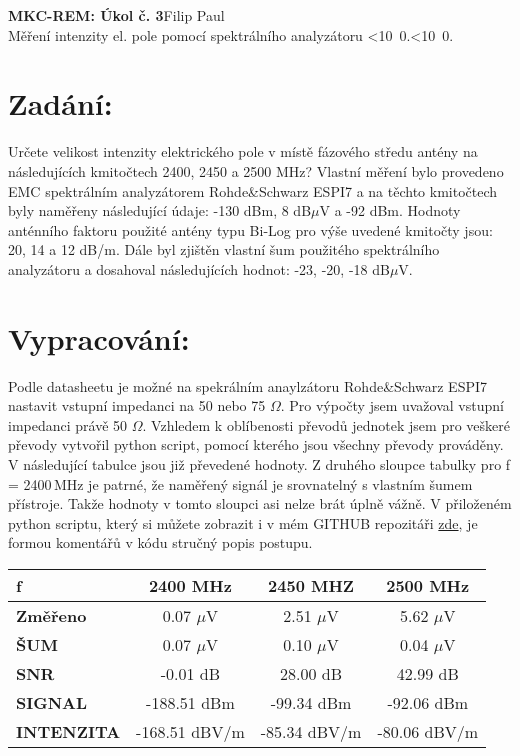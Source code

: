 \documentclass[10pt, a4paper]{article}%
\def\mydate{\leavevmode\hbox{\twodigits\day.\twodigits\month.\the\year}}
\def\twodigits#1{\ifnum#1<10 0\fi\the#1}
\begin{document}
\begin{flushleft}%
	\textbf{\Large{MKC-REM: Úkol č. 3}}\hfill Filip Paul\\
	\large{Měření intenzity el. pole pomocí spektrálního analyzátoru \hfill\mydate}
\end{flushleft}
	\section*{\Large Zadání:}
	Určete velikost intenzity elektrického pole v místě fázového středu antény na následujících
	kmitočtech 2400, 2450 a 2500 MHz? Vlastní měření bylo provedeno EMC spektrálním
	analyzátorem Rohde\&Schwarz ESPI7 a na těchto kmitočtech byly naměřeny následující údaje:
	-130 dBm, 8 dB$\mu$V a -92 dBm. Hodnoty anténního faktoru použité antény typu Bi-Log pro výše
	uvedené kmitočty jsou: 20, 14 a 12 dB/m. Dále byl zjištěn vlastní šum použitého spektrálního
	analyzátoru a dosahoval následujících hodnot: -23, -20, -18 dB$\mu$V.


	\section*{\Large Vypracování:}
	Podle datasheetu je možné na spekrálním anaylzátoru Rohde\&Schwarz ESPI7 nastavit vstupní impedanci na 50 nebo 75 $\Omega$.
	Pro výpočty jsem uvažoval vstupní impedanci právě 50 $\Omega$. Vzhledem k oblíbenosti převodů jednotek jsem 
	pro veškeré převody vytvořil python script, pomocí kterého jsou všechny převody prováděny. V následující tabulce
	jsou již převedené hodnoty. Z druhého sloupce tabulky pro f = 2400\,MHz je patrné, že naměřený signál
	je srovnatelný s vlastním šumem přístroje. Takže hodnoty v tomto sloupci asi nelze brát úplně vážně.
	V přiloženém python scriptu, který si můžete zobrazit i v mém GITHUB repozitáři
	\href{https://github.com/FilipPaul/ctvrtak_letni_semestr/blob/main/MKC_REM/ukol_3_SPEKTRAK/README.md}{\color{blue} zde}, je
	formou komentářů v kódu stručný popis postupu.

	 \begin{table}[htbp]
		\centering
		  \begin{tabular}{|l|c|c|c|}
		  \hline
		  \textbf{f} & \textbf{2400 MHz} & \textbf{2450 MHZ} & \textbf{2500 MHz} \bigstrut\\
		  \hline
		  \textbf{Změřeno} & 0.07 $\mu$V &  2.51 $\mu$V &  5.62 $\mu$V \bigstrut\\
		  \hline
		  \textbf{ŠUM} & 0.07 $\mu$V &  0.10 $\mu$V &  0.04 $\mu$V \bigstrut\\
		  \hline
		  \textbf{SNR} & -0.01 dB &  28.00 dB &  42.99 dB \bigstrut\\
		  \hline
		  \textbf{SIGNAL} & -188.51 dBm &  -99.34 dBm &  -92.06 dBm \bigstrut\\
		  \hline
		  \textbf{INTENZITA} & -168.51 dBV/m &  -85.34 dBV/m &  -80.06 dBV/m \bigstrut\\
		  \hline
		  \end{tabular}%
		\label{tab:addlabel}%
	  \end{table}%
	 
\end{document}
